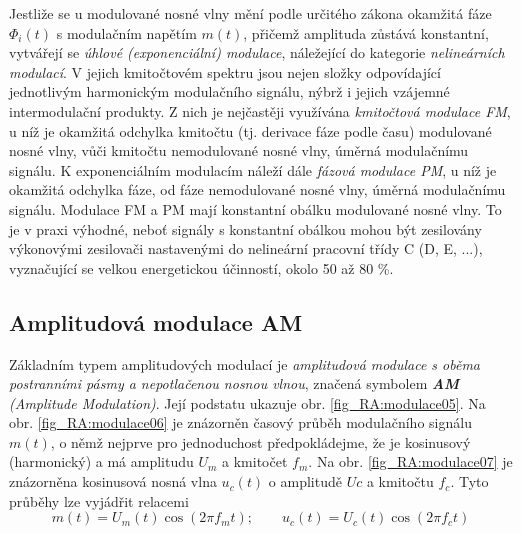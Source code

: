       Jestliže se u modulované nosné vlny mění podle určitého zákona okamžitá fáze \(\Phi_i(t)\) s modulačním 
      napětím \(m(t)\), přičemž amplituda zůstává konstantní, vytvářejí se \emph{úhlové (exponenciální) 
      modulace}, náležející do kategorie \emph{nelineárních modulací}. V jejich kmitočtovém spektru jsou 
      nejen složky odpovídající jednotlivým harmonickým modulačního signálu, nýbrž i jejich vzájemné 
      intermodulační produkty. Z nich je nejčastěji využívána \emph{kmitočtová modulace FM}, u níž je 
      okamžitá odchylka kmitočtu (tj. derivace fáze podle času) modulované nosné vlny, vůči kmitočtu 
      nemodulované nosné vlny, úměrná modulačnímu signálu. K exponenciálním modulacím náleží dále 
      \emph{fázová modulace PM}, u níž je okamžitá odchylka fáze, od fáze nemodulované nosné vlny, úměrná 
      modulačnímu signálu. Modulace FM a PM mají konstantní obálku modulované nosné vlny. To je v praxi 
      výhodné, neboť signály s konstantní obálkou mohou být zesilovány výkonovými zesilovači nastavenými do 
      nelineární pracovní třídy C (D, E, ...), vyznačující se velkou energetickou účinností, okolo 50 až 80 
      \%.
      
    \subsection{Amplitudová modulace AM}
      Základním typem amplitudových modulací je \emph{amplitudová modulace s oběma postranními pásmy a 
      nepotlačenou nosnou vlnou}, značená symbolem \emph{\textbf{AM} (Amplitude Modulation)}. Její podstatu 
      ukazuje obr. \ref{fig_RA:modulace05}. Na obr. \ref{fig_RA:modulace06} je znázorněn časový průběh 
      modulačního signálu \(m(t)\), o němž nejprve pro jednoduchost předpokládejme, že je kosinusový 
      (harmonický) a má amplitudu \(U_m\) a kmitočet \(f_m\). Na obr. \ref{fig_RA:modulace07} je znázorněna 
      kosinusová nosná vlna \(u_c(t)\) o amplitudě \(Uc\) a kmitočtu \(f_c\). Tyto průběhy lze vyjádřit 
      relacemi
      \begin{equation}\label{eq:RA_mdlc_02}
        m(t) = U_m(t)\cos(2\pi f_m t); \qquad u_c(t) = U_c(t)\cos(2\pi f_c t)
      \end{equation}

